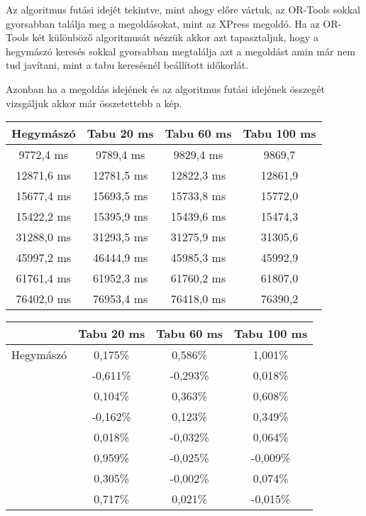 Az algoritmus futási idejét tekintve, mint ahogy előre vártuk, az OR-Tools sokkal gyorsabban találja meg a megoldásokat, mint az XPress megoldó. Ha az OR-Tools két különböző algoritmusát nézzük akkor azt tapasztaljuk, hogy a hegymászó keresés sokkal gyorsabban megtalálja azt a megoldást amin már nem tud javítani, mint a tabu keresésnél beállított időkorlát.


Azonban ha a megoldás idejének és az algoritmus futási idejének összegét vizsgáljuk akkor már összetettebb a kép.


\begin{center}
 \begin{tabular}{ |c|c|c|c| } 
\hline
Hegymászó  & Tabu  20 ms & Tabu  60 ms & Tabu  100 ms\\
\hline
9772,4	ms & 9789,4 ms & 	9829,4 ms &	9869,7\\
12871,6 ms &	12781,5 ms &	12822,3 ms &	12861,9\\
15677,4 ms &	15693,5 ms &	15733,8 ms &	15772,0\\
15422,2 ms &	15395,9 ms &	15439,6 ms &	15474,3\\
31288,0 ms &	31293,5 ms &	31275,9 ms &	31305,6\\
45997,2 ms &	46444,9 ms &	45985,3 ms &	45992,9\\
61761,4 ms &	61952,3 ms &	61760,2 ms &	61807,0\\
76402,0 ms &	76953,4 ms &	76418,0 ms &	76390,2\\

\hline
\end{tabular}
\end{center}


\begin{center}
 \begin{tabular}{ |c|c|c|c| } 
\hline
& Tabu  20 ms & Tabu  60 ms & Tabu  100 ms\\
\hline
Hegymászó  &0,175\% &	0,586\% &	1,001\% \\
&-0,611\% &	-0,293\% &	0,018\% \\
&0,104\% &	0,363\% &	0,608\% \\
&-0,162\% &	0,123\% &	0,349\% \\
&0,018\% &	-0,032\% &	0,064\% \\
&0,959\% &	-0,025\% &	-0,009\%\\
&0,305\% &	-0,002\% &	0,074\% \\
&0,717\% &	0,021\% &	-0,015\% \\

\hline
\end{tabular}
\end{center}

